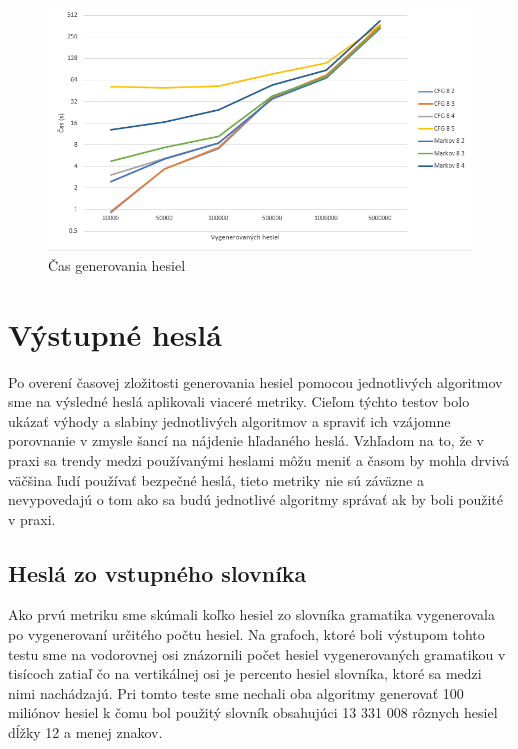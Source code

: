 \begin{figure}[ht]
    \centering
    \includegraphics[width=1\textwidth]{generateTime}
    \caption{Čas generovania hesiel}
    \label{fig:generateTime}
\end{figure}

\paragraph{}
\section{Výstupné heslá}
\label{sec:pass}
Po overení časovej zložitosti generovania hesiel pomocou jednotlivých algoritmov sme na výsledné heslá aplikovali viaceré metriky. Cieľom týchto testov bolo ukázať výhody a slabiny jednotlivých algoritmov a spraviť ich vzájomne porovnanie v zmysle šancí na nájdenie hľadaného heslá. Vzhľadom na to, že v praxi sa trendy medzi používanými heslami môžu meniť a časom by mohla drvivá väčšina ľudí používať bezpečné heslá, tieto metriky nie sú záväzne a nevypovedajú o tom ako sa budú jednotlivé algoritmy správať ak by boli použité v praxi.

\subsection{Heslá zo vstupného slovníka}
Ako prvú metriku sme skúmali koľko hesiel zo slovníka gramatika vygenerovala po vygenerovaní určitého počtu hesiel. Na grafoch, ktoré boli výstupom tohto testu sme na vodorovnej osi znázornili počet hesiel vygenerovaných gramatikou v tisícoch zatiaľ čo na vertikálnej osi je percento hesiel slovníka, ktoré sa medzi nimi nachádzajú. Pri tomto teste sme nechali oba algoritmy generovať 100 miliónov hesiel k čomu bol použitý slovník obsahujúci 13 331 008 rôznych hesiel dĺžky 12 a menej znakov.

